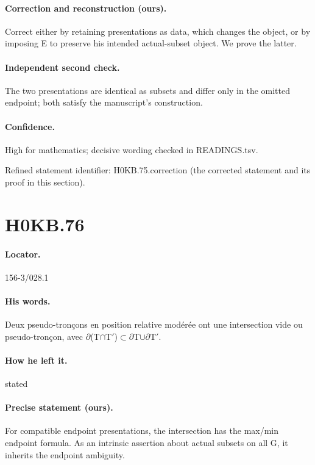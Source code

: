 \paragraph{Correction and reconstruction (ours).} Correct either by retaining presentations as data, which changes the object, or by imposing E to preserve his intended actual-subset object. We prove the latter.

\paragraph{Independent second check.} The two presentations are identical as subsets and differ only in the omitted endpoint; both satisfy the manuscript’s construction.

\paragraph{Confidence.} High for mathematics; decisive wording checked in READINGS.tsv.

\noindent Refined statement identifier: H0KB.75.correction (the corrected statement and its proof in this section).

\section*{H0KB.76}\label{statement:H0KB.76}
\paragraph{Locator.} 156-3/028.1

\paragraph{His words.} Deux pseudo-tronçons en position relative modérée ont une intersection vide ou pseudo-tronçon, avec \ensuremath{\partial}(T\ensuremath{\cap}T\ensuremath{\prime})\ensuremath{\subset}\ensuremath{\partial}T\ensuremath{\cup}\ensuremath{\partial}T\ensuremath{\prime}.

\paragraph{How he left it.} stated

\paragraph{Precise statement (ours).} For compatible endpoint presentations, the intersection has the max/min endpoint formula. As an intrinsic assertion about actual subsets on all G, it inherits the endpoint ambiguity.


